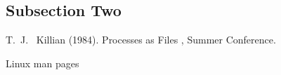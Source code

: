 \documentclass[twoside,twocolumn]{article}
\begin{document}
\subsection{Subsection Two}



\begin{thebibliography}{99} %

T.~J.~ Killian (1984).
\newblock Processes as Files
, Summer Conference.

Linux man pages

\end{thebibliography}

\end{document}

